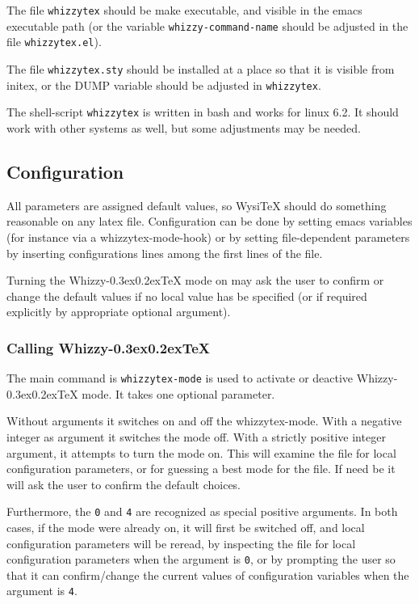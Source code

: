 \documentclass{article}
\let \lst \verb
\def \whizzy{{Whizzy\kern -0.3ex\raise 0.2ex\hbox{\TeX}}}
\begin{document}
The file \lst"whizzytex" should be make executable, and visible in the emacs
executable path (or the variable \lst"whizzy-command-name" should be
adjusted in the file \lst"whizzytex.el"). 

The file \lst"whizzytex.sty" should be installed at a place so that it is
visible  from initex, or the DUMP variable should be adjusted in
\lst"whizzytex".  

The shell-script \lst"whizzytex" is written in bash and works for linux 6.2. 
It should work with other systems as well, but some adjustments may be
needed.

\subsection {Configuration} 

All parameters are assigned default values, so WysiTeX should do something
reasonable on any latex file.
Configuration can be done by setting emacs variables (for instance via a
whizzytex-mode-hook) or by setting file-dependent parameters by 
inserting configurations lines among the first lines of the file.

Turning the {\whizzy} mode on may ask the user to confirm or change the
default values if no local value has be specified (or if required explicitly
by appropriate optional argument).


\subsubsection {Calling {\whizzy}}

The main command is \lst"whizzytex-mode" is used to activate or deactive 
{\whizzy} mode. It takes one optional parameter. 

Without arguments it switches on and off the whizzytex-mode. With a negative
integer as argument it switches the mode off. With a strictly positive
integer argument, it attempts to turn the mode on.  This will examine the
file for local configuration parameters, or for guessing a best mode for the
file. If need be it will ask the user to confirm the default choices.

Furthermore, the \lst"0" and \lst"4" are recognized as special positive
arguments. In both cases, if the mode were already on, it will first be
switched off, and local configuration parameters will be reread, by
inspecting the file for local configuration parameters when the argument is
\lst"0", or by prompting the user so that it can confirm/change the current
values of configuration variables when the argument is \lst"4".
\end{document}
